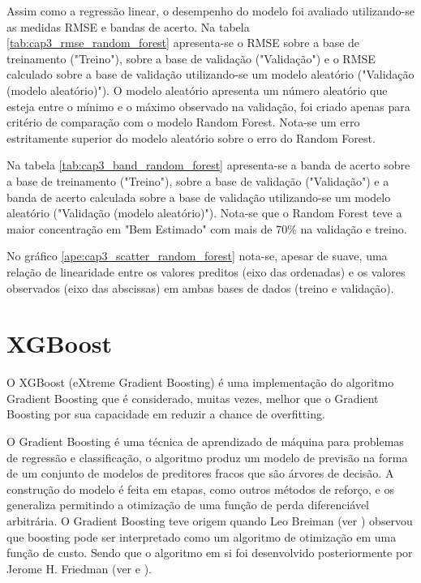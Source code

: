 Assim como a regressão linear, o desempenho do modelo foi avaliado utilizando-se as medidas RMSE e bandas de acerto. Na tabela \ref{tab:cap3_rmse_random_forest} apresenta-se o RMSE sobre a base de treinamento ("Treino"), sobre a base de validação ("Validação") e o RMSE calculado sobre a base de validação utilizando-se um modelo aleatório ("Validação (modelo aleatório)"). O modelo aleatório apresenta um número aleatório que esteja entre o mínimo e o máximo observado na validação, foi criado apenas para critério de comparação com o modelo Random Forest. Nota-se um erro estritamente superior do modelo aleatório sobre o erro do Random Forest.

Na tabela \ref{tab:cap3_band_random_forest} apresenta-se a banda de acerto sobre a base de treinamento ("Treino"), sobre a base de validação ("Validação") e a banda de acerto calculada sobre a base de validação utilizando-se um modelo aleatório ("Validação (modelo aleatório)"). Nota-se que o Random Forest teve a maior concentração em "Bem Estimado" com mais de 70\% na validação e treino.

No gráfico \ref{ape:cap3_scatter_random_forest} nota-se, apesar de suave, uma relação de linearidade entre os valores preditos (eixo das ordenadas) e os valores observados (eixo das abscissas) em ambas bases de dados (treino e validação).

\section{XGBoost}
\label{sec:xgboost}

O XGBoost (eXtreme Gradient Boosting) é uma implementação do algoritmo Gradient Boosting que é considerado, muitas vezes, melhor que o Gradient Boosting por sua capacidade em reduzir a chance de overfitting.

O Gradient Boosting é uma técnica de aprendizado de máquina para problemas de regressão e classificação, o algoritmo produz um modelo de previsão na forma de um conjunto de modelos de preditores fracos que são árvores de decisão. A construção do modelo é feita em etapas, como outros métodos de reforço, e os generaliza permitindo a otimização de uma função de perda diferenciável arbitrária. O Gradient Boosting teve origem quando Leo Breiman (ver \citet{Breiman1997}) observou que boosting pode ser interpretado como um algoritmo de otimização em uma função de custo. Sendo que o algoritmo em si foi desenvolvido posteriormente por Jerome H. Friedman (ver \citet{Friedman199902} e \citet{Friedman199903}).

